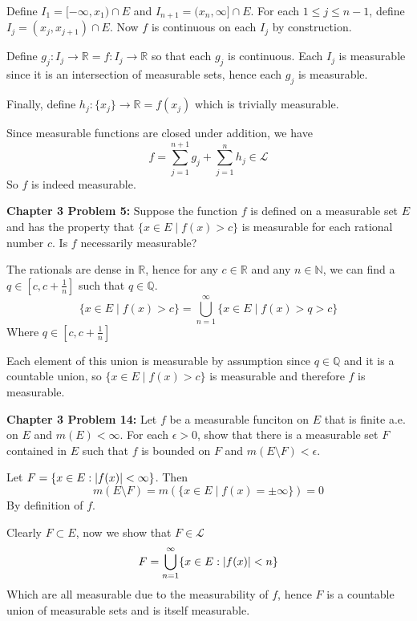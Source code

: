 \documentclass[11pt]{article}
\DeclarePairedDelimiter{\card}{\lvert}{\rvert}
\newcommand{\R}{\mathbb{R}}
\newcommand{\N}{\mathbb{N}}
\newcommand{\Q}{\mathbb{Q}}
\begin{document}
    Define $I_1 = [-\infty, x_1) \cap E$ and $I_{n+1} = (x_n, \infty] \cap E$.
    For each $1 \leq j \leq n-1$, define $I_j = (x_j, x_{j+1}) \cap E$.
    Now $f$ is continuous on each $I_j$ by construction.

    Define $g_j: I_j \rightarrow \R = f: I_j \rightarrow \R$ so that each $g_j$ is continuous.
    Each $I_j$ is measurable since it is an intersection of measurable sets, hence each $g_j$ is measurable.

    Finally, define $h_j: \{ x_j \} \rightarrow \R = f(x_j)$ which is trivially measurable.

    Since measurable functions are closed under addition, we have
    \[
        f = \sum_{j=1}^{n+1} g_j + \sum_{j=1}^{n} h_j \in \mathcal{L}
    \]
    So $f$ is indeed measurable.

    \clearpage

    \begin{mybox}
        \textbf{Chapter 3 Problem 5:} Suppose the function $f$ is defined on a measurable set $E$ and has the property that $\{ x \in E \mid f(x) > c \}$ is measurable for each rational number $c$.
        Is $f$ necessarily measurable?
    \end{mybox}

    The rationals are dense in $\R$, hence for any $c \in \R$ and any $n \in \N$, we can find a $q \in \left[c, c + \frac{1}{n}\right]$ such that $q \in \Q$.
    \[
        \{ x \in E \mid f(x) > c \} = \bigcup_{n=1}^{\infty} \{ x \in E \mid f(x) > q > c \}
    \]
    Where $q \in \left[c, c + \frac{1}{n}\right]$

    Each element of this union is measurable by assumption since $q \in \Q$ and it is a countable union, so $\{ x \in E \mid f(x) > c \}$ is measurable and therefore $f$ is measurable.

    \clearpage

    \begin{mybox}
        \textbf{Chapter 3 Problem 14:} Let $f$ be a measurable funciton on $E$ that is finite a.e. on $E$ and $m(E) < \infty$.
        For each $\epsilon > 0$, show that there is a measurable set $F$ contained in $E$ such that $f$ is bounded on $F$ and $m(E \setminus F) < \epsilon$.
    \end{mybox}

    Let $F = \{ x \in E : \card{f(x)} < \infty \}$.
    Then
    \[
        m(E \setminus F) = m(\{ x \in E \mid f(x) = \pm \infty \}) = 0
    \]
    By definition of $f$.

    Clearly $F \subset E$, now we show that $F \in \mathcal{L}$
    \[
        F = \bigcup_{n=1}^{\infty} \{ x \in E : \card{f(x)} < n \}
    \]
    Which are all measurable due to the measurability of $f$, hence $F$ is a countable union of measurable sets and is itself measurable.
\end{document}
